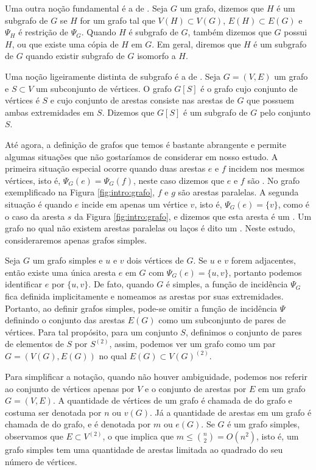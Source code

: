 Uma outra noção fundamental é a de . Seja $G$ um grafo, dizemos que $H$ é um subgrafo de $G$ se $H$ for um grafo tal que $V(H) \subset V(G)$, $E(H) \subset E(G)$ e $\Psi_H$ é restrição de $\Psi_G$. Quando $H$ é subgrafo de $G$, também dizemos que $G$ possui $H$, ou que existe uma cópia de $H$ em $G$. Em geral, diremos que $H$ é um subgrafo de $G$ quando existir subgrafo de $G$ isomorfo a $H$.

Uma noção ligeiramente distinta de subgrafo é a de . Seja $G = (V,E)$ um grafo e $S \subset V$ um subconjunto de vértices. O grafo $G[S]$ é o grafo cujo conjunto de vértices é $S$ e cujo conjunto de arestas consiste nas arestas de $G$ que possuem ambas extremidades em $S$. Dizemos que $G[S]$ é um subgrafo de $G$  pelo conjunto $S$.

Até agora, a definição de grafos que temos é bastante abrangente e permite algumas situações que não gostaríamos de considerar em nosso estudo. A primeira situação especial ocorre quando duas arestas $e$ e $f$ incidem nos mesmos vértices, isto é, $\Psi_G(e) = \Psi_G(f)$, neste caso dizemos que $e$ e $f$ são . No grafo exemplificado na Figura \ref{fig:intro:grafo}, $f$ e $g$ são arestas paralelas.
A segunda situação é quando $e$ incide em apenas um vértice $v$, isto é, $\Psi_G(e) = \{v\}$, como é o caso da aresta $s$ da Figura \ref{fig:intro:grafo}, e dizemos que esta aresta é um . Um grafo no qual não existem arestas paralelas ou laços é dito um . Neste estudo, consideraremos apenas grafos simples.

Seja $G$ um grafo simples e $u$ e $v$ dois vértices de $G$. Se $u$ e $v$ forem adjacentes, então existe uma única aresta $e$ em $G$ com $\Psi_G(e) = \{u,v\}$, portanto podemos identificar $e$ por $\{u,v\}$. De fato, quando $G$ é simples, a função de incidência $\Psi_G$ fica definida implicitamente e nomeamos as arestas por suas extremidades. Portanto, ao definir grafos simples, pode-se omitir a função de incidência $\Psi$ definindo o conjunto das arestas $E(G)$ como um subconjunto de pares de vértices. Para tal propósito, para um conjunto $S$, definimos o conjunto de pares de elementos de $S$ por $S^{(2)}$, assim, podemos ver um grafo como um par $G = (V(G),E(G))$ no qual $E(G) \subset V(G)^{(2)}$.

Para simplificar a notação, quando não houver ambiguidade, podemos nos referir ao conjunto de vértices apenas por $V$ e o conjunto de arestas por $E$ em um grafo $G = (V,E)$. A quantidade de vértices de um grafo é chamada de  do grafo e costuma ser denotada por $n$ ou $v(G)$. Já a quantidade de arestas em um grafo é chamada de  do grafo, e é denotada por $m$ ou $e(G)$. Se $G$ é um grafo simples, observamos que $E \subset V^{(2)}$, o que implica que $m \leq \binom{n}{2} = O(n^2)$, isto é, um grafo simples tem uma quantidade de arestas limitada ao quadrado do seu número de vértices.

